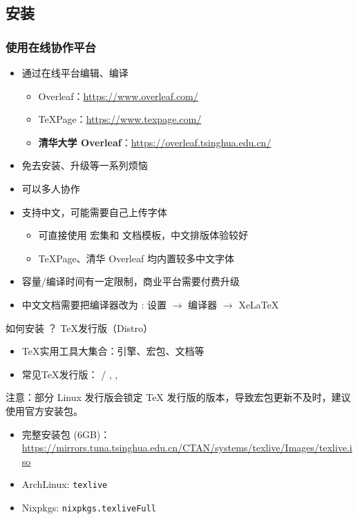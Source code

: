 \subsection{安装}

\begin{frame}[fragile]
  \frametitle{使用在线协作平台}
  \begin{itemize}
    \item 通过在线平台编辑、编译
      \begin{itemize}
        \item Overleaf：\url{https://www.overleaf.com/}
        \item TeXPage：\url{https://www.texpage.com/}
        \item \textbf{清华大学 Overleaf}：\url{https://overleaf.tsinghua.edu.cn/}
      \end{itemize}
    \item 免去安装、升级等一系列烦恼
    \item 可以多人协作
    \item 支持中文，可能需要自己上传字体
      \begin{itemize}
        \item 可直接使用  宏集和  文档模板，中文排版体验较好
        \item TeXPage、清华 Overleaf 均内置较多中文字体
      \end{itemize}
    \item 容量/编译时间有一定限制，商业平台需要付费升级
    \item 中文文档需要把编译器改为 \XeLaTeX{}: 设置 $\rightarrow$ 编译器 $\rightarrow$ XeLaTeX
  \end{itemize}
\end{frame}

\begin{frame}{如何安装 ？}
  \TeX{}发行版（Distro）
  \begin{itemize}
    \item \TeX{}实用工具大集合：引擎、宏包、文档等
    \item 常见\TeX{}发行版：
      \alert{\TL{} / \MacTeX}, \CTeX, \MiKTeX
  \end{itemize}
    
  注意：部分 Linux 发行版会锁定 \TeX{} 发行版的版本，导致宏包更新不及时，建议使用官方安装包。

  \begin{itemize}
    \item 完整安装包 (6GB)：{\footnotesize \url{https://mirrors.tuna.tsinghua.edu.cn/CTAN/systems/texlive/Images/texlive.iso}}
    \item ArchLinux: \texttt{texlive} 
    \item Nixpkgs: \texttt{nixpkgs.texliveFull} 
  \end{itemize}
\end{frame}

